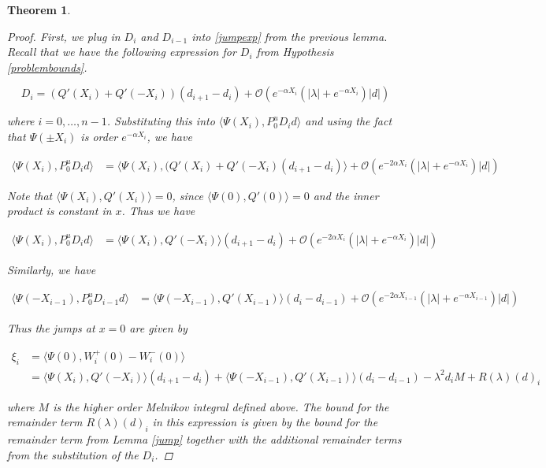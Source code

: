 \documentclass[12pt]{article}
\newtheorem{theorem}{Theorem}
\begin{document}
\begin{theorem}
\begin{proof}

First, we plug in $D_i$ and $D_{i-1}$ into \eqref{jumpexp} from the previous lemma. 
Recall that we have the following expression for $D_i$ from Hypothesis \ref{problembounds}.

\[
D_i = ( Q'(X_i) + Q'(-X_i))(d_{i+1} - d_i ) + \mathcal{O} \left( e^{-\alpha X_i} \left( |\lambda| +  e^{-\alpha X_i}  \right) |d| \right)
\]

where $i = 0, \dots, n-1$. Substituting this into $\langle \Psi(X_i), P^u_0 D_i d \rangle$ and using the fact that $\Psi(\pm X_i)$ is order $e^{-\alpha X_i}$, we have

\begin{align*}
\langle \Psi(X_i), P^u_0 D_i d \rangle &= \langle \Psi(X_i), (Q'(X_i) + Q'(-X_i)(d_{i+1} - d_i ) \rangle + \mathcal{O} \left( e^{-2 \alpha X_i} \left( |\lambda| +  e^{-\alpha X_i}  \right) |d| \right)
\end{align*}

Note that $\langle \Psi(X_i), Q'(X_i) \rangle = 0$, since $\langle \Psi(0), Q'(0) \rangle = 0$ and the inner product is constant in $x$. Thus we have 

\begin{align*}
\langle \Psi(X_i), P^u_0 D_i d \rangle &= \langle \Psi(X_i), Q'(-X_i) \rangle (d_{i+1} - d_i ) + \mathcal{O} \left( e^{-2 \alpha X_i} \left( |\lambda| +  e^{-\alpha X_i}  \right) |d| \right)
\end{align*}

Similarly, we have

\begin{align*}
\langle \Psi(-X_{i-1}), P^u_0 D_{i-1} d \rangle &= \langle \Psi(-X_{i-1}), Q'(X_{i-1}) \rangle (d_i - d_{i-1} ) + \mathcal{O} \left( e^{-2 \alpha X_{i-1}} \left( |\lambda| +  e^{-\alpha X_{i-1}}  \right) |d| \right)
\end{align*}

Thus the jumps at $x = 0$ are given by

\begin{align*}
\xi_i &= \langle \Psi(0), W_i^+(0) - W_i^-(0) \rangle \\
&= \langle \Psi(X_i), Q'(-X_i) \rangle (d_{i+1} - d_i ) + \langle \Psi(-X_{i-1}), Q'(X_{i-1}) \rangle (d_i - d_{i-1} ) - \lambda^2 d_i M + R(\lambda)(d)_i
\end{align*}

where $M$ is the higher order Melnikov integral defined above. The bound for the remainder term $R(\lambda)(d)_i$ in this expression is given by the bound for the remainder term from Lemma \ref{jump} together with the additional remainder terms from the substitution of the $D_i$.


\end{proof}
\end{theorem}
\end{document}
